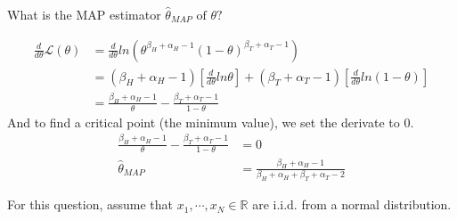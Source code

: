 \documentclass[11pt,largemargins]{homework}
\begin{document}
\begin{alphaparts}
	\questionpart
	What is the MAP estimator $\hat{\theta}_{MAP}\text{ of }\theta?$

	\begin{align*}
		\frac{d}{d\theta}\mathcal{L}(\theta)&=\frac{d}{d\theta}ln\left( \theta^{\beta_H+\alpha_H-1}{(1-\theta)}^{\beta_T+\alpha_T-1}\right)\\
		&= (\beta_H+\alpha_H-1)\left[ \frac{d}{d\theta}ln\theta\right]+(\beta_T+\alpha_T-1)\left[ \frac{d}{d\theta}ln(1-\theta)\right]\\
		&= \frac{\beta_H+\alpha_H-1}{\theta}-\frac{\beta_T+\alpha_T-1}{1-\theta}
	\end{align*}
	And to find a critical point (the minimum value), we set the derivate to 0.
	\begin{align*}
		\frac{\beta_H+\alpha_H-1}{\theta}-\frac{\beta_T+\alpha_T-1}{1-\theta}&=0\\
		\hat{\theta}_{MAP}&=\frac{\beta_H+\alpha_H-1}{\beta_H+\alpha_H+\beta_T+\alpha_T-2}
	\end{align*}
\end{alphaparts}
\question For this question, assume that $x_1, \cdots, x_N\in\mathbb{R}$ are i.i.d. from a normal distribution.
\end{document}
